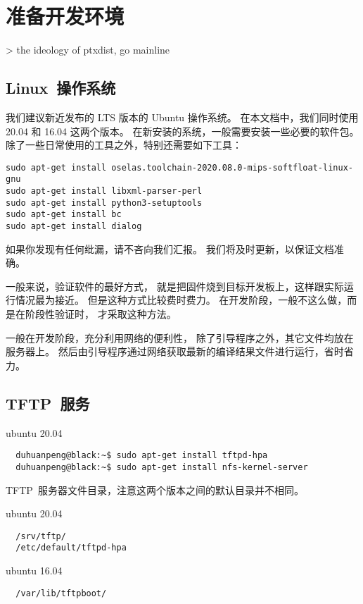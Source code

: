 \chapter{准备开发环境}

> the ideology of ptxdist, go mainline

\section{Linux~操作系统}
我们建议新近发布的 LTS 版本的 Ubuntu 操作系统。
在本文档中，我们同时使用 20.04 和 16.04 这两个版本。
在新安装的系统，一般需要安装一些必要的软件包。
除了一些日常使用的工具之外，特别还需要如下工具：

\begin{lstlisting}
sudo apt-get install oselas.toolchain-2020.08.0-mips-softfloat-linux-gnu
sudo apt-get install libxml-parser-perl
sudo apt-get install python3-setuptools
sudo apt-get install bc
sudo apt-get install dialog
\end{lstlisting}

如果你发现有任何纰漏，请不吝向我们汇报。
我们将及时更新，以保证文档准确。

一般来说，验证软件的最好方式，
就是把固件烧到目标开发板上，这样跟实际运行情况最为接近。
但是这种方式比较费时费力。
在开发阶段，一般不这么做，而是在阶段性验证时，
才采取这种方法。

一般在开发阶段，充分利用网络的便利性，
除了引导程序之外，其它文件均放在服务器上。
然后由引导程序通过网络获取最新的编译结果文件进行运行，省时省力。



\section{TFTP~服务}
ubuntu 20.04
\begin{lstlisting}  
  duhuanpeng@black:~$ sudo apt-get install tftpd-hpa
  duhuanpeng@black:~$ sudo apt-get install nfs-kernel-server
\end{lstlisting}

TFTP~服务器文件目录，注意这两个版本之间的默认目录并不相同。

ubuntu 20.04
\begin{lstlisting}  
  /srv/tftp/
  /etc/default/tftpd-hpa
\end{lstlisting}

ubuntu 16.04
\begin{lstlisting}
  /var/lib/tftpboot/
\end{lstlisting}

